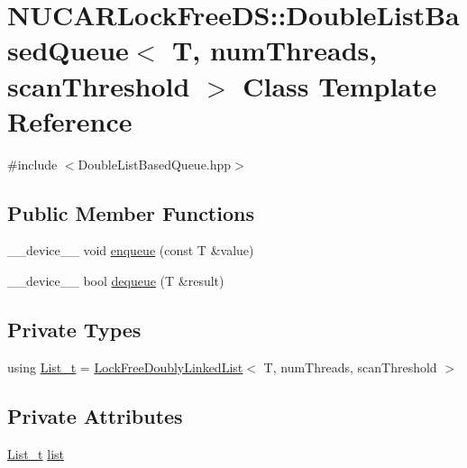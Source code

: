 \hypertarget{class_n_u_c_a_r_lock_free_d_s_1_1_double_list_based_queue}{}\section{N\+U\+C\+A\+R\+Lock\+Free\+DS\+:\+:Double\+List\+Based\+Queue$<$ T, num\+Threads, scan\+Threshold $>$ Class Template Reference}
\label{class_n_u_c_a_r_lock_free_d_s_1_1_double_list_based_queue}


{\ttfamily \#include $<$Double\+List\+Based\+Queue.\+hpp$>$}

\subsection*{Public Member Functions}
\begin{DoxyCompactItemize}
\item 
\+\_\+\+\_\+device\+\_\+\+\_\+ void \mbox{\hyperlink{class_n_u_c_a_r_lock_free_d_s_1_1_double_list_based_queue_ad9f196b3ea9ee4c684a5fab3c6bb9ddd}{enqueue}} (const T \&value)
\item 
\+\_\+\+\_\+device\+\_\+\+\_\+ bool \mbox{\hyperlink{class_n_u_c_a_r_lock_free_d_s_1_1_double_list_based_queue_a9541892be0892b41bc17a354586aa173}{dequeue}} (T \&result)
\end{DoxyCompactItemize}
\subsection*{Private Types}
\begin{DoxyCompactItemize}
\item 
using \mbox{\hyperlink{class_n_u_c_a_r_lock_free_d_s_1_1_double_list_based_queue_adfcec8aa40c6690e45107405c2fa2c35}{List\+\_\+t}} = \mbox{\hyperlink{class_n_u_c_a_r_lock_free_d_s_1_1_lock_free_doubly_linked_list}{Lock\+Free\+Doubly\+Linked\+List}}$<$ T, num\+Threads, scan\+Threshold $>$
\end{DoxyCompactItemize}
\subsection*{Private Attributes}
\begin{DoxyCompactItemize}
\item 
\mbox{\hyperlink{class_n_u_c_a_r_lock_free_d_s_1_1_double_list_based_queue_adfcec8aa40c6690e45107405c2fa2c35}{List\+\_\+t}} \mbox{\hyperlink{class_n_u_c_a_r_lock_free_d_s_1_1_double_list_based_queue_ac63ca28afaaf2cb487e9ff03b601e20b}{list}}
\end{DoxyCompactItemize}


